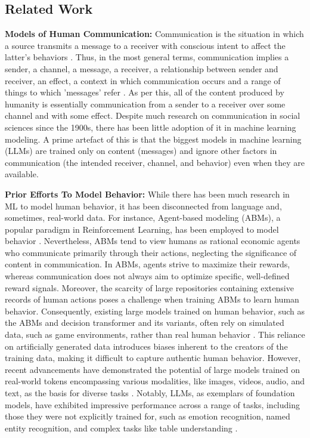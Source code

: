 \subsection{Related Work}

\textbf{Models of Human Communication:}
Communication is the situation in which a source transmits a message to a receiver with conscious intent to affect the latter’s behaviors \citep{osgood1957measurement,miller1966defining}. Thus, in the most general terms, communication implies a sender, a channel, a message, a receiver, a relationship between sender and receiver, an effect, a context in which communication occurs and a range of things to which 'messages' refer \citep{mcquail2015communication,lasswell1948structure}. As per this, all of the content produced by humanity is essentially communication from a sender to a receiver over some channel and with some effect. Despite much research on communication in social sciences since the 1900s, there has been little adoption of it in machine learning modeling. A prime artefact of this is that the biggest models in machine learning (LLMs) are trained only on content (messages) and ignore other factors in communication (the intended receiver, channel, and behavior) even when they are available.


\textbf{Prior Efforts To Model Behavior:} While there has been much research in ML to model human behavior, it has been disconnected from language and, sometimes, real-world data. For instance, Agent-based modeling (ABMs), a popular paradigm in Reinforcement Learning, has been employed to model behavior \citep{bankes2002agent,romero2023two,park2023generative}. Nevertheless, ABMs tend to view humans as rational economic agents who communicate primarily through their actions, neglecting the significance of content in communication. In ABMs, agents strive to maximize their rewards, whereas communication does not always aim to optimize specific, well-defined reward signals. Moreover, the scarcity of large repositories containing extensive records of human actions poses a challenge when training ABMs to learn human behavior. Consequently, existing large models trained on human behavior, such as the ABMs and decision transformer and its variants, often rely on simulated data, such as game environments, rather than real human behavior \citep{chen2021decision}. This reliance on artificially generated data introduces biases inherent to the creators of the training data, making it difficult to capture authentic human behavior. However, recent advancements have demonstrated the potential of large models trained on real-world tokens encompassing various modalities, like images, videos, audio, and text, as the basis for diverse tasks \citep{ge2023planting,li2023blip2}. Notably, LLMs, as exemplars of foundation models, have exhibited impressive performance across a range of tasks, including those they were not explicitly trained for, such as emotion recognition, named entity recognition, and complex tasks like table understanding \citep{ye2023large, bhattacharya2023video}.



